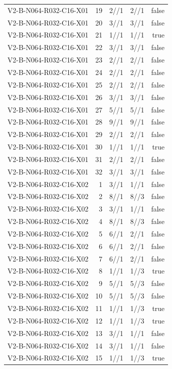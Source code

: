 {\begin{longtable}{lrrrr}
V2-B-N064-R032-C16-X01 & 19 & 2//1 & 2//1 & false \\
V2-B-N064-R032-C16-X01 & 20 & 3//1 & 3//1 & false \\
V2-B-N064-R032-C16-X01 & 21 & 1//1 & 1//1 & true \\
V2-B-N064-R032-C16-X01 & 22 & 3//1 & 3//1 & false \\
V2-B-N064-R032-C16-X01 & 23 & 2//1 & 2//1 & false \\
V2-B-N064-R032-C16-X01 & 24 & 2//1 & 2//1 & false \\
V2-B-N064-R032-C16-X01 & 25 & 2//1 & 2//1 & false \\
V2-B-N064-R032-C16-X01 & 26 & 3//1 & 3//1 & false \\
V2-B-N064-R032-C16-X01 & 27 & 5//1 & 5//1 & false \\
V2-B-N064-R032-C16-X01 & 28 & 9//1 & 9//1 & false \\
V2-B-N064-R032-C16-X01 & 29 & 2//1 & 2//1 & false \\
V2-B-N064-R032-C16-X01 & 30 & 1//1 & 1//1 & true \\
V2-B-N064-R032-C16-X01 & 31 & 2//1 & 2//1 & false \\
V2-B-N064-R032-C16-X01 & 32 & 3//1 & 3//1 & false \\
V2-B-N064-R032-C16-X02 & 1 & 3//1 & 1//1 & false \\
V2-B-N064-R032-C16-X02 & 2 & 8//1 & 8//3 & false \\
V2-B-N064-R032-C16-X02 & 3 & 3//1 & 1//1 & false \\
V2-B-N064-R032-C16-X02 & 4 & 8//1 & 8//3 & false \\
V2-B-N064-R032-C16-X02 & 5 & 6//1 & 2//1 & false \\
V2-B-N064-R032-C16-X02 & 6 & 6//1 & 2//1 & false \\
V2-B-N064-R032-C16-X02 & 7 & 6//1 & 2//1 & false \\
V2-B-N064-R032-C16-X02 & 8 & 1//1 & 1//3 & true \\
V2-B-N064-R032-C16-X02 & 9 & 5//1 & 5//3 & false \\
V2-B-N064-R032-C16-X02 & 10 & 5//1 & 5//3 & false \\
V2-B-N064-R032-C16-X02 & 11 & 1//1 & 1//3 & true \\
V2-B-N064-R032-C16-X02 & 12 & 1//1 & 1//3 & true \\
V2-B-N064-R032-C16-X02 & 13 & 3//1 & 1//1 & false \\
V2-B-N064-R032-C16-X02 & 14 & 3//1 & 1//1 & false \\
V2-B-N064-R032-C16-X02 & 15 & 1//1 & 1//3 & true \\

\end{longtable}}

